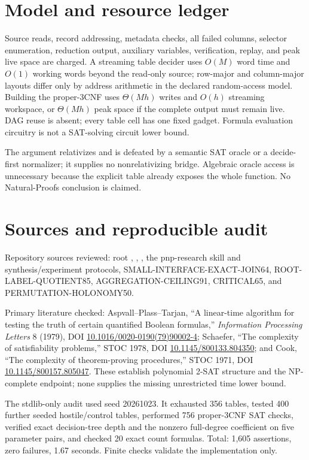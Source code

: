 \documentclass[11pt]{article}
\begin{document}
\section{Model and resource ledger}

Source reads, record addressing, metadata checks, all failed columns,
selector enumeration, reduction output, auxiliary variables, verification,
replay, and peak live space are charged.  A streaming table decider uses
$O(M)$ word time and $O(1)$ working words beyond the read-only source;
row-major and column-major layouts differ only by address arithmetic in the
declared random-access model.  Building the proper-3CNF uses
$\Theta(Mh)$ writes and $O(h)$ streaming workspace, or $\Theta(Mh)$ peak
space if the complete output must remain live.  DAG reuse is absent; every
table cell has one fixed gadget.  Formula evaluation circuitry is not a
SAT-solving circuit lower bound.

The argument relativizes and is defeated by a semantic SAT oracle or a
decide-first normalizer; it supplies no nonrelativizing bridge.  Algebraic
oracle access is unnecessary because the explicit table already exposes the
whole function.  No Natural-Proofs conclusion is claimed.

\section{Sources and reproducible audit}

\begin{sloppypar}
Repository sources reviewed: root , ,
, the pnp-research skill and synthesis/experiment protocols,
SMALL-INTERFACE-EXACT-JOIN64, ROOT-LABEL-QUOTIENT85,
AGGREGATION-CEILING91, CRITICAL65, and PERMUTATION-HOLONOMY50.
\end{sloppypar}

Primary literature checked: Aspvall--Plass--Tarjan, ``A linear-time
algorithm for testing the truth of certain quantified Boolean formulas,''
\emph{Information Processing Letters} 8 (1979), DOI
\url{10.1016/0020-0190(79)90002-4}; Schaefer, ``The complexity of
satisfiability problems,'' STOC 1978, DOI \url{10.1145/800133.804350}; and
Cook, ``The complexity of theorem-proving procedures,'' STOC 1971, DOI
\url{10.1145/800157.805047}.  These establish polynomial 2-SAT structure
and the NP-complete endpoint; none supplies the missing unrestricted time
lower bound.

The stdlib-only audit used seed 20261023.  It exhausted 356 tables, tested
400 further seeded hostile/control tables, performed 756 proper-3CNF SAT
checks, verified exact decision-tree depth and the nonzero full-degree
coefficient on five parameter pairs, and checked 20 exact count formulas.
Total: 1,605 assertions, zero failures, 1.67 seconds.  Finite checks validate
the implementation only.
\end{document}
